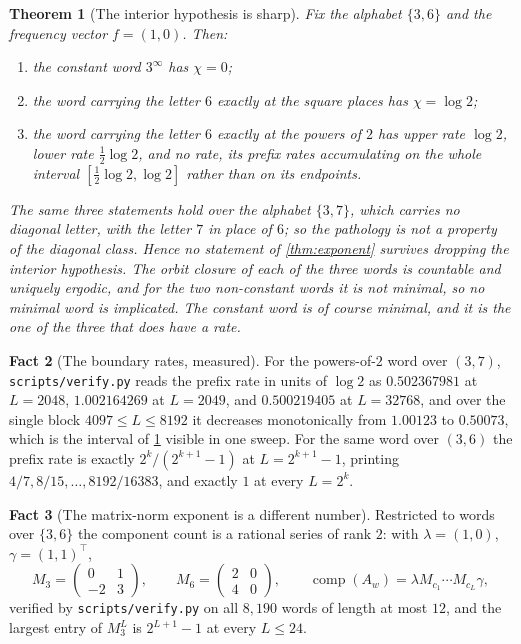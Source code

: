 \documentclass[11pt]{amsart}
\newtheorem{theorem}{Theorem}[section]
\theoremstyle{definition}
\newtheorem{fact}[theorem]{Fact}
\theoremstyle{remark}
\newcommand{\vpy}{\texttt{scripts/\allowbreak verify.py}}
\DeclareMathOperator{\comp}{comp}
\begin{document}
\begin{theorem}[The interior hypothesis is sharp]
\label{thm:sharp}
Fix the alphabet $\{3,6\}$ and the frequency vector $f = (1,0)$. Then:
\begin{enumerate}
\item the constant word $3^\infty$ has $\chi = 0$;
\item the word carrying the letter $6$ exactly at the square places has $\chi = \log 2$;
\item the word carrying the letter $6$ exactly at the powers of $2$ has upper rate $\log 2$, lower rate $\tfrac12 \log 2$, and no rate, its prefix rates accumulating on the whole interval $[\tfrac12 \log 2, \log 2]$ rather than on its endpoints.
\end{enumerate}
The same three statements hold over the alphabet $\{3,7\}$, which carries no diagonal letter, with the letter $7$ in place of $6$; so the pathology is not a property of the diagonal class. Hence no statement of \cref{thm:exponent} survives dropping the interior hypothesis. The orbit closure of each of the three words is countable and uniquely ergodic, and for the two non-constant words it is not minimal, so no minimal word is implicated. The constant word is of course minimal, and it is the one of the three that does have a rate.
\end{theorem}

\begin{fact}[The boundary rates, measured]
\label{fact:boundary}
For the powers-of-$2$ word over $(3,7)$, \vpy{} reads the prefix rate in units of $\log 2$ as $0.502367981$ at $L = 2048$, $1.002164269$ at $L = 2049$, and $0.500219405$ at $L = 32768$, and over the single block $4097 \le L \le 8192$ it decreases monotonically from $1.00123$ to $0.50073$, which is the interval of \cref{thm:sharp} visible in one sweep. For the same word over $(3,6)$ the prefix rate is exactly $2^k/(2^{k+1}-1)$ at $L = 2^{k+1}-1$, printing $4/7, 8/15, \dots, 8192/16383$, and exactly $1$ at every $L = 2^k$.
\end{fact}

\begin{fact}[The matrix-norm exponent is a different number]
\label{fact:norm}
Restricted to words over $\{3,6\}$ the component count is a rational series of rank $2$: with $\lambda = (1,0)$, $\gamma = (1,1)^{\!\top}$,
\[
M_3 = \begin{pmatrix} 0 & 1 \\ -2 & 3\end{pmatrix}, \qquad M_6 = \begin{pmatrix} 2 & 0 \\ 4 & 0 \end{pmatrix},
\qquad \comp(A_w) = \lambda M_{c_1} \cdots M_{c_L} \gamma ,
\]
verified by \vpy{} on all $8{,}190$ words of length at most $12$, and the largest entry of $M_3^L$ is $2^{L+1}-1$ at every $L \le 24$.
\end{fact}
\end{document}
